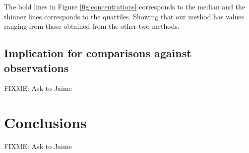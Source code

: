\documentclass[useAMS,usenatbib]{mn2e}
\begin{document}
The bold lines in Figure \ref{fig:concentrations} corresponds to the median and the thinner lines corresponds to the quartiles. Showing that our method has values ​​ranging from those obtained from the other two methods.
\subsection{Implication for comparisons against observations}
FIXME: Ask to Jaime


\section{Conclusions}
\label{sec:conclusions}
FIXME: Ask to Jaime



\end{document}
